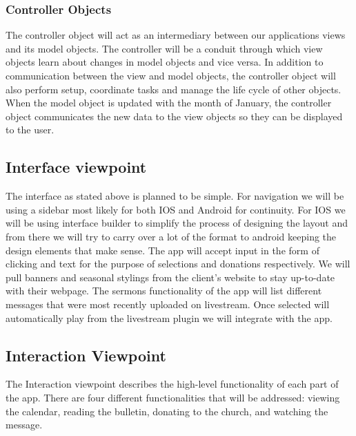 \documentclass[letterpaper,10pt,draftclsnofoot,onecolumn,titlepage]{IEEEtran}
\begin{document}
			\subsubsection{Controller Objects}
				The controller object will act as an intermediary between our applications views and its model objects.
				The controller will be a conduit through which view objects learn about changes in model objects and vice versa.
				In addition to communication between the view and model objects, the controller object will also perform setup, coordinate tasks and manage the life cycle of other objects.
				When the model object is updated with the month of January, the controller object communicates the new data to the view objects so they can be displayed to the user.


		\subsection{Interface viewpoint}
			The interface as stated above is planned to be simple.
			For navigation we will be using a sidebar most likely for both IOS and Android for continuity.
			For IOS we will be using interface builder to simplify the process of designing the layout and from there we will try to carry over a lot of the format to android keeping the design elements that make sense.
			The app will accept input in the form of clicking and text for the purpose of selections and donations respectively.
			We will pull banners and seasonal stylings from the client’s website to stay up-to-date with their webpage.
			The sermons functionality of the app will list different messages that were most recently uploaded on livestream.
			Once selected will automatically play from the livestream plugin we will integrate with the app.


		\subsection{Interaction Viewpoint}
			The Interaction viewpoint describes the high-level functionality of each part of the app.
			There are four different functionalities that will be addressed: viewing the calendar, reading the bulletin, donating to the church, and watching the message.
\end{document}
